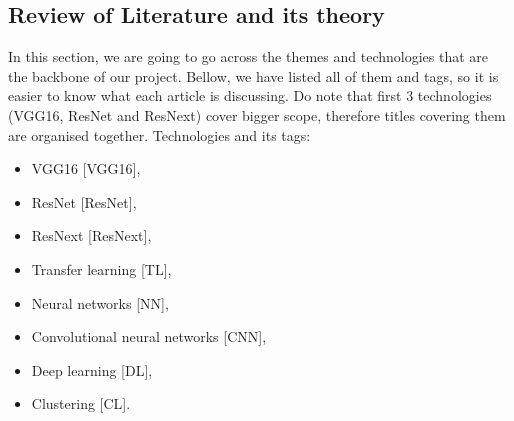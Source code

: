 \subsection{Review of Literature and its theory}
In this section, we are going to go across the themes and technologies that are the backbone of our project. Bellow, we have listed all of them and tags, so it is easier to know what each article is discussing. Do note that first 3 technologies (VGG16, ResNet and ResNext) cover bigger scope, therefore titles covering them are organised together.
Technologies and its tags:
\begin{itemize}
  \item VGG16 [VGG16],
  \item ResNet [ResNet],
  \item ResNext [ResNext],
  \item Transfer learning [TL],
  \item Neural networks [NN],
  \item Convolutional neural networks [CNN],
  \item Deep learning [DL],
  \item Clustering [CL].
\end{itemize}



